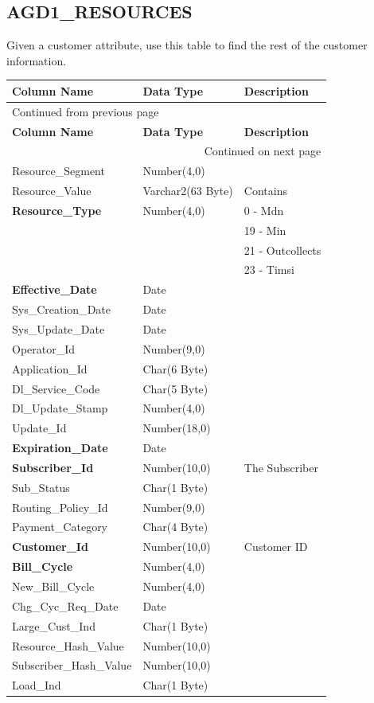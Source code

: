 \documentclass[12pt,twoside]{article}
\begin{document}
\normalsize
\newpage 
\subsection{AGD1\_RESOURCES}
\label{sec:orgheadline35}
Given a customer attribute, use this table to find the rest of the customer information.
\footnotesize

\begin{longtable}{l|l|l}
\hline
\textbf{Column Name} & \textbf{Data Type} & \textbf{Description}\\
\hline
\endfirsthead
\multicolumn{3}{l}{Continued from previous page} \\
\hline

\textbf{Column Name} & \textbf{Data Type} & \textbf{Description} \\

\hline
\endhead
\hline\multicolumn{3}{r}{Continued on next page} \\
\endfoot
\endlastfoot
\hline
Resource\_Segment & Number(4,0) & \\
Resource\_Value & Varchar2(63 Byte) & Contains\\
\textbf{Resource\_Type} & Number(4,0) & 0 - Mdn\\
 &  & 19 - Min\\
 &  & 21 - Outcollects\\
 &  & 23 - Timsi\\
\textbf{Effective\_Date} & Date & \\
Sys\_Creation\_Date & Date & \\
Sys\_Update\_Date & Date & \\
Operator\_Id & Number(9,0) & \\
Application\_Id & Char(6 Byte) & \\
Dl\_Service\_Code & Char(5 Byte) & \\
Dl\_Update\_Stamp & Number(4,0) & \\
Update\_Id & Number(18,0) & \\
\textbf{Expiration\_Date} & Date & \\
\textbf{Subscriber\_Id} & Number(10,0) & The Subscriber\\
Sub\_Status & Char(1 Byte) & \\
Routing\_Policy\_Id & Number(9,0) & \\
Payment\_Category & Char(4 Byte) & \\
\textbf{Customer\_Id} & Number(10,0) & Customer ID\\
\textbf{Bill\_Cycle} & Number(4,0) & \\
New\_Bill\_Cycle & Number(4,0) & \\
Chg\_Cyc\_Req\_Date & Date & \\
Large\_Cust\_Ind & Char(1 Byte) & \\
Resource\_Hash\_Value & Number(10,0) & \\
Subscriber\_Hash\_Value & Number(10,0) & \\
Load\_Ind & Char(1 Byte) & \\
\hline
\end{longtable}
\end{document}
